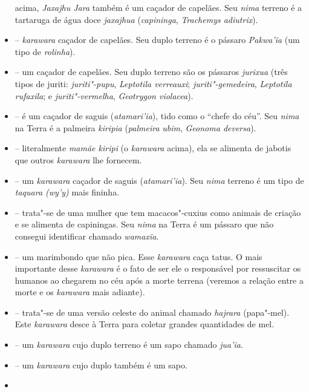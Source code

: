 \begin{itemize}
  acima, \emph{Jaxajhu Jara} também é um caçador de capelães.
  Seu \emph{nima} terreno é a tartaruga de água doce \emph{jaxajhua}
  (\emph{capininga}, \emph{Trachemys adiutrix}).
\item
   -- \emph{karawara} caçador de
  capelães. Seu duplo terreno é o pássaro \emph{Pakwa'ĩa} (um tipo de
  \emph{rolinha}).
\item
   -- um caçador de capelães. Seu duplo
  terreno são os pássaros \emph{jurixua} (três tipos de juriti:
  \emph{juriti"-pupu}, \emph{Leptotila verreauxi};
  \emph{juriti"-gemedeira}, \emph{Leptotila} \emph{rufaxila}; e
  \emph{juriti"-vermelha}, \emph{Geotrygon violacea}).
\item
  \emph{} -- é um caçador de saguis
  (\emph{atamari'ia}), tido como o ``chefe do céu''. Seu \emph{nima} na
  Terra é a palmeira \emph{kiripia} (\emph{palmeira} \emph{ubim},
  \emph{Geonoma deversa}).
\item
  \emph{} -- literalmente \emph{mamãe kiripi}
  (o \emph{karawara} acima), ela se alimenta de jabotis que outros
  \emph{karawara} lhe fornecem.
\item
  \emph{} -- um \emph{karawara} caçador de saguis
  (\emph{atamari'ia}). Seu \emph{nima} terreno é um tipo de
  \emph{taquara (wy'y)} mais fininha.
\item
  \emph{} -- trata"-se de uma mulher que tem
  macacos"-cuxius como animais de criação e se alimenta de capiningas.
  Seu \emph{nima} na Terra é um pássaro que não consegui identificar
  chamado \emph{wamaxĩa}.
\item
  \emph{} -- um marimbondo que não pica. Esse
  \emph{karawara} caça tatus. O mais importante desse \emph{karawara} é
  o fato de ser ele o responsável por ressuscitar os humanos ao chegarem
  no céu após a morte terrena (veremos a relação entre a morte e os
  \emph{karawara} mais adiante).
\item
  \emph{} -- trata"-se de uma versão celeste do animal
  chamado \emph{hajrara} (papa"-mel). Este \emph{karawara} desce à Terra
  para coletar grandes quantidades de mel.
\item
  \emph{} -- um \emph{karawara} cujo duplo terreno é
  um sapo chamado \emph{jua'ia}.
\item
  \emph{} -- um \emph{karawara} cujo duplo também é
  um sapo.
\item

\end{itemize}
